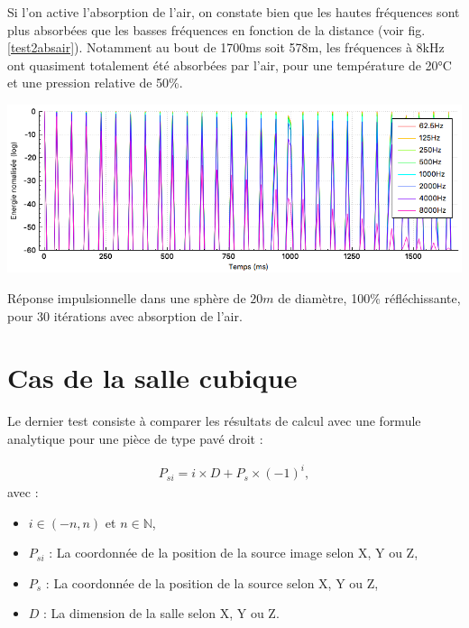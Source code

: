 Si l'on active l'absorption de l'air, on constate bien que les hautes fréquences sont plus absorbées que les basses fréquences en fonction de la distance (voir fig. \ref{test2absair}). Notamment au bout de 1700ms soit 578m, les fréquences à 8kHz ont quasiment totalement été absorbées par l'air, pour une température de 20°C et une pression relative de 50\%.


\begin{figureth}
	\includegraphics[width=\linewidth]{images/test2absair}
	\caption{Réponse impulsionnelle dans une sphère de $20m$ de diamètre, 100\% réfléchissante, pour 30 itérations avec absorption de l'air.}
	\label{test2absair}
\end{figureth}



\section{Cas de la salle cubique}

Le dernier test consiste à comparer les résultats de calcul avec une formule analytique pour une pièce de type pavé droit \cite[p. 182-189]{mcgovern} : 

%

\begin{align}
P_{si} = i \times D + P_s \times (-1)^i,
\end{align}
avec : 
\begin{itemize}
\item$i \in (-n, n)$ et $n \in \mathbb{N}$,
\item$P_{si}$ : La coordonnée de la position de la source image selon X, Y ou Z,
\item$P_s$ : La coordonnée de la position de la source selon X, Y ou Z,
\item$D$ : La dimension de la salle selon X, Y ou Z.
\end{itemize}


